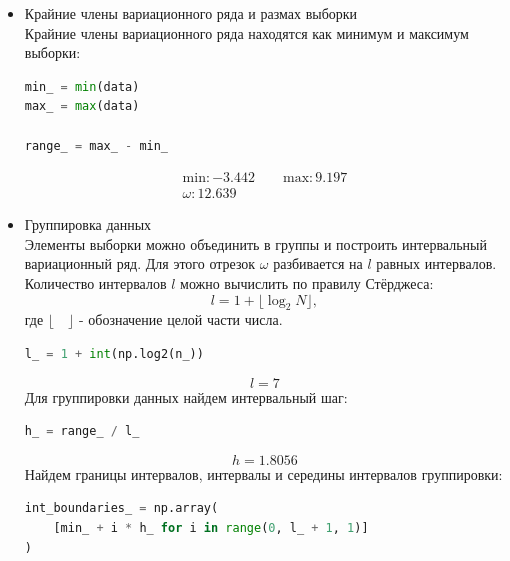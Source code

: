 \documentclass[a4paper, 14pt]{extarticle}
\begin{document}
\begin{itemize}
    \item Крайние члены вариационного ряда и размах выборки\\
    Крайние члены вариационного ряда находятся как минимум и максимум выборки:
    \begin{center}
        \begin{lstlisting}[language=Python]
min_ = min(data)
max_ = max(data)

range_ = max_ - min_
        \end{lstlisting}
    \end{center}
    \vspace{-15pt}
    \begin{gather*}
        \text{min}: -3.442 \qquad \text{max}: 9.197 \\
        \omega: 12.639
    \end{gather*}
    \item Группировка данных\\
    Элементы выборки можно объединить в группы и построить интервальный вариационный ряд. 
    Для этого отрезок $\omega$ разбивается на $l$ равных интервалов. Количество интервалов $l$ 
    можно вычислить по правилу Стёрджеса:
    \begin{equation*}
        l = 1 + \lfloor \log_2 N \rfloor,
    \end{equation*}
    где $\lfloor \quad \rfloor$ - обозначение целой части числа.
    \begin{center}
        \begin{lstlisting}[language=Python]
l_ = 1 + int(np.log2(n_))
        \end{lstlisting}
    \end{center}
    \vspace{-15pt}
    \begin{equation*}
        l = 7
    \end{equation*}
    Для группировки данных найдем интервальный шаг:
    \begin{center}
        \begin{lstlisting}[language=Python]
h_ = range_ / l_
        \end{lstlisting}
    \end{center}
    \vspace{-15pt}
    \begin{equation*}
        h = 1.8056
    \end{equation*}
    Найдем границы интервалов, интервалы и середины интервалов группировки:
    \begin{center}
        \begin{lstlisting}[language=Python]
int_boundaries_ = np.array(
    [min_ + i * h_ for i in range(0, l_ + 1, 1)]
)


\end{lstlisting}
\end{center}
\end{itemize}
\end{document}
